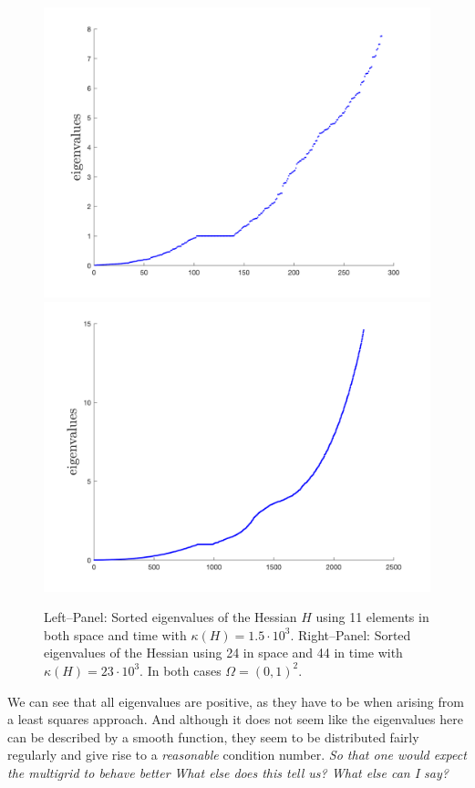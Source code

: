 \documentclass[../draft_1.tex]{subfiles}
\begin{document}
\begin{figure}[ht!]
	\centering
	\includegraphics[scale=0.4]{images/implementation/eigenvalues/eigenvalues_11by11elem}
	\includegraphics[scale=0.4]{images/implementation/eigenvalues/eigenvalues_24by44elem}
	\caption{Left--Panel: Sorted eigenvalues of the Hessian $H$ using 11 elements in both space and time with $\kappa(H)=1.5\cdot10^3$. Right--Panel:   Sorted eigenvalues of the Hessian using 24 in space and 44 in time  with $\kappa(H)=23\cdot10^3$. In both cases $\Omega = (0,1)^2$.}
\end{figure}

We can see that all eigenvalues are positive, as they have to be when arising from a least squares approach. And although it does not seem like the eigenvalues here can be described by a smooth function, they seem to be distributed fairly regularly and give rise to a \textit{reasonable} condition number. \textit{So that one would expect the multigrid to behave better}
\textit{What else does this tell us? What else can I say?}
\end{document}

